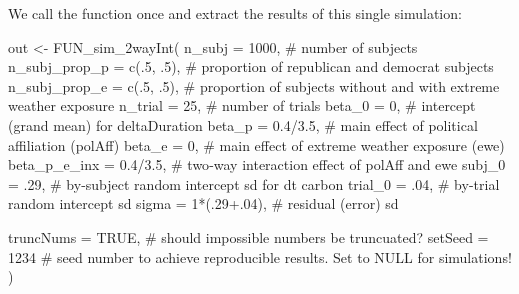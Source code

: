 \documentclass[
  letterpaper,
  DIV=11,
  numbers=noendperiod]{scrartcl}
\newenvironment{Shaded}{\begin{snugshade}}{\end{snugshade}}
\newcommand{\AttributeTok}[1]{\textcolor[rgb]{0.40,0.45,0.13}{#1}}
\newcommand{\CommentTok}[1]{\textcolor[rgb]{0.37,0.37,0.37}{#1}}
\newcommand{\ConstantTok}[1]{\textcolor[rgb]{0.56,0.35,0.01}{#1}}
\newcommand{\DecValTok}[1]{\textcolor[rgb]{0.68,0.00,0.00}{#1}}
\newcommand{\FloatTok}[1]{\textcolor[rgb]{0.68,0.00,0.00}{#1}}
\newcommand{\FunctionTok}[1]{\textcolor[rgb]{0.28,0.35,0.67}{#1}}
\newcommand{\NormalTok}[1]{\textcolor[rgb]{0.00,0.23,0.31}{#1}}
\newcommand{\OtherTok}[1]{\textcolor[rgb]{0.00,0.23,0.31}{#1}}
\newcommand{\SpecialCharTok}[1]{\textcolor[rgb]{0.37,0.37,0.37}{#1}}
\begin{document}
We call the function once and extract the results of this single
simulation:

\begin{Shaded}
\begin{Highlighting}[]
\NormalTok{out }\OtherTok{\textless{}{-}} \FunctionTok{FUN\_sim\_2wayInt}\NormalTok{(}
  \AttributeTok{n\_subj         =}        \DecValTok{1000}\NormalTok{, }\CommentTok{\# number of subjects}
  \AttributeTok{n\_subj\_prop\_p  =}   \FunctionTok{c}\NormalTok{(.}\DecValTok{5}\NormalTok{, .}\DecValTok{5}\NormalTok{), }\CommentTok{\# proportion of republican and democrat subjects}
  \AttributeTok{n\_subj\_prop\_e  =}   \FunctionTok{c}\NormalTok{(.}\DecValTok{5}\NormalTok{, .}\DecValTok{5}\NormalTok{), }\CommentTok{\# proportion of subjects without and with extreme weather exposure}
  \AttributeTok{n\_trial        =}          \DecValTok{25}\NormalTok{, }\CommentTok{\# number of trials}
  \AttributeTok{beta\_0         =}           \DecValTok{0}\NormalTok{, }\CommentTok{\# intercept (grand mean) for deltaDuration}
  \AttributeTok{beta\_p         =}     \FloatTok{0.4}\SpecialCharTok{/}\FloatTok{3.5}\NormalTok{, }\CommentTok{\# main effect of political affiliation (polAff)}
  \AttributeTok{beta\_e         =}           \DecValTok{0}\NormalTok{, }\CommentTok{\# main effect of extreme weather exposure (ewe)}
  \AttributeTok{beta\_p\_e\_inx   =}     \FloatTok{0.4}\SpecialCharTok{/}\FloatTok{3.5}\NormalTok{, }\CommentTok{\# two{-}way interaction effect of polAff and ewe}
  \AttributeTok{subj\_0         =}\NormalTok{         .}\DecValTok{29}\NormalTok{, }\CommentTok{\# by{-}subject random intercept sd for dt carbon}
  \AttributeTok{trial\_0        =}\NormalTok{         .}\DecValTok{04}\NormalTok{, }\CommentTok{\# by{-}trial random intercept sd}
  \AttributeTok{sigma          =} \DecValTok{1}\SpecialCharTok{*}\NormalTok{(.}\DecValTok{29}\FloatTok{+.04}\NormalTok{), }\CommentTok{\# residual (error) sd}
  
  \AttributeTok{truncNums      =}        \ConstantTok{TRUE}\NormalTok{, }\CommentTok{\# should impossible numbers be truncuated?}
  \AttributeTok{setSeed        =}        \DecValTok{1234}  \CommentTok{\# seed number to achieve reproducible results. Set to NULL for simulations!}
\NormalTok{)}


\end{Highlighting}
\end{Shaded}
\end{document}
